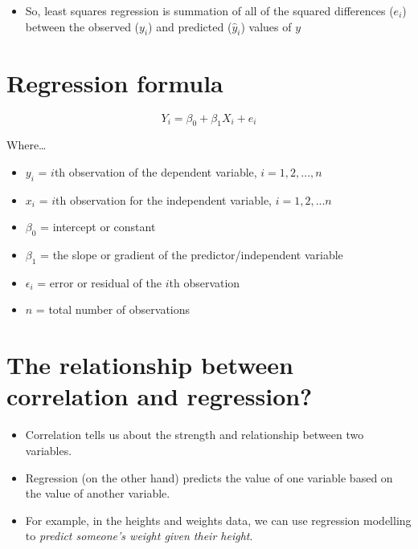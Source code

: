 \documentclass[
]{article}
\providecommand{\tightlist}{%
  \setlength{\itemsep}{0pt}\setlength{\parskip}{0pt}}
\begin{document}
\begin{itemize}
\tightlist
\item
  So, least squares regression is summation of all of the squared
  differences (\(e_{i}\)) between the observed (\(y_{i}\)) and predicted
  (\(\hat{y}_{i}\)) values of \(y\)
\end{itemize}

\hypertarget{regression-formula}{%
\section{Regression formula}\label{regression-formula}}

\[Y_i = \beta_0 + \beta_1 X_i + e_i\]

Where\ldots{}

\begin{itemize}
\tightlist
\item
  \(y_{i}\) = \(i\)th observation of the dependent variable,
  \(i = 1,2,...,n\)
\item
  \(x_{i}\) = \(i\)th observation for the independent variable,
  \(i = 1,2,...n\)
\item
  \(\beta_{0}\) = intercept or constant
\item
  \(\beta_{1}\) = the slope or gradient of the predictor/independent
  variable
\item
  \(\epsilon_{i}\) = error or residual of the \(i\)th observation
\item
  \(n\) = total number of observations
\end{itemize}

\hypertarget{the-relationship-between-correlation-and-regression}{%
\section{The relationship between correlation and
regression?}\label{the-relationship-between-correlation-and-regression}}

\begin{itemize}
\tightlist
\item
  Correlation tells us about the strength and relationship between two
  variables.
\item
  Regression (on the other hand) predicts the value of one variable
  based on the value of another variable.
\item
  For example, in the heights and weights data, we can use regression
  modelling to \emph{predict someone's weight given their height}.
\end{itemize}
\end{document}
